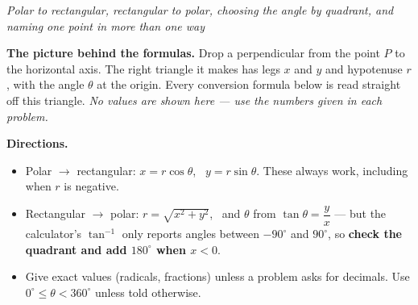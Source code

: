 \documentclass[12pt]{article}
\begin{document}

\begin{center}\small\textit{Polar to rectangular, rectangular to polar, choosing the angle by quadrant, and naming one point in more than one way}\end{center}

\vspace{0.1cm}
\noindent\textbf{The picture behind the formulas.} Drop a perpendicular from the point $P$ to the horizontal axis. The right triangle it makes has legs $x$ and $y$ and hypotenuse $r$, with the angle $\theta$ at the origin. Every conversion formula below is read straight off this triangle. \emph{No values are shown here --- use the numbers given in each problem.}

\begin{center}
\end{center}

\vspace{-0.1cm}
\noindent\textbf{Directions.}
\begin{itemize}[leftmargin=0.9cm, itemsep=1pt, topsep=3pt]
  \item Polar $\to$ rectangular: $x = r\cos\theta$, \ $y = r\sin\theta$. These always work, including when $r$ is negative.
  \item Rectangular $\to$ polar: $r = \sqrt{x^2 + y^2}$, \ and $\theta$ from $\tan\theta = \dfrac{y}{x}$ --- but the calculator's $\tan^{-1}$ only reports angles between $-90^\circ$ and $90^\circ$, so \textbf{check the quadrant and add $180^\circ$ when $x < 0$}.
  \item Give exact values (radicals, fractions) unless a problem asks for decimals. Use $0^\circ \le \theta < 360^\circ$ unless told otherwise.
\end{itemize}
\vspace{0.1cm}
\end{document}
